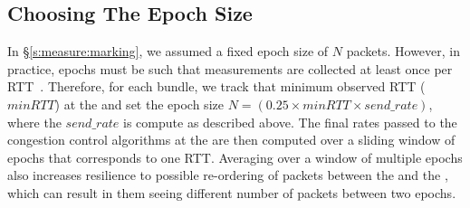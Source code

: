 
\subsection{Choosing The Epoch Size}
\label{s:measure:epoch}
%

In \S\ref{s:measure:marking}, we assumed a fixed epoch size of $N$ packets. However, in practice, epochs must be such that measurements are collected at least once per RTT~\cite{ccp}. Therefore, for each bundle, we track that minimum observed RTT ($minRTT$) at the \inbox and set the epoch size $N = (0.25 \times minRTT \times send\_rate)$, where the $send\_rate$ is compute as described above. The final rates passed to the congestion control algorithms at the \inbox are then computed over a sliding window of epochs that corresponds to one RTT. Averaging over a window of multiple epochs also increases resilience to possible re-ordering of packets between the \inbox and the \outbox, which can result in them seeing different number of packets between two epochs.


